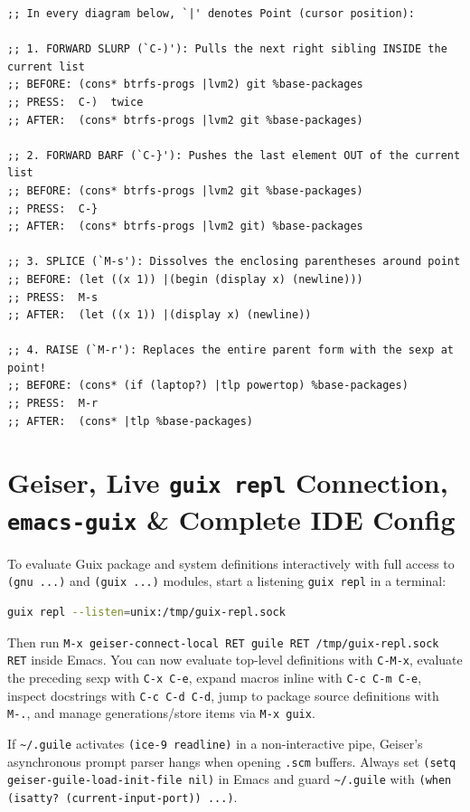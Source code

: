\documentclass[11pt,oneside]{book}
\begin{document}
\begin{lstlisting}[language=GuileScheme]
;; In every diagram below, `|' denotes Point (cursor position):

;; 1. FORWARD SLURP (`C-)'): Pulls the next right sibling INSIDE the current list
;; BEFORE: (cons* btrfs-progs |lvm2) git %base-packages
;; PRESS:  C-)  twice
;; AFTER:  (cons* btrfs-progs |lvm2 git %base-packages)

;; 2. FORWARD BARF (`C-}'): Pushes the last element OUT of the current list
;; BEFORE: (cons* btrfs-progs |lvm2 git %base-packages)
;; PRESS:  C-}
;; AFTER:  (cons* btrfs-progs |lvm2 git) %base-packages

;; 3. SPLICE (`M-s'): Dissolves the enclosing parentheses around point
;; BEFORE: (let ((x 1)) |(begin (display x) (newline)))
;; PRESS:  M-s
;; AFTER:  (let ((x 1)) |(display x) (newline))

;; 4. RAISE (`M-r'): Replaces the entire parent form with the sexp at point!
;; BEFORE: (cons* (if (laptop?) |tlp powertop) %base-packages)
;; PRESS:  M-r
;; AFTER:  (cons* |tlp %base-packages)
\end{lstlisting}

\section{Geiser, Live \texttt{guix repl} Connection, \texttt{emacs-guix} \& Complete IDE Config}

To evaluate Guix package and system definitions interactively with full access to \texttt{(gnu ...)} and \texttt{(guix ...)} modules, start a listening \texttt{guix repl} in a terminal:
\begin{lstlisting}[language=Bash]
guix repl --listen=unix:/tmp/guix-repl.sock
\end{lstlisting}
Then run \texttt{M-x geiser-connect-local RET guile RET /tmp/guix-repl.sock RET} inside Emacs. You can now evaluate top-level definitions with \texttt{C-M-x}, evaluate the preceding sexp with \texttt{C-x C-e}, expand macros inline with \texttt{C-c C-m C-e}, inspect docstrings with \texttt{C-c C-d C-d}, jump to package source definitions with \texttt{M-.}, and manage generations/store items via \texttt{M-x guix}.

\begin{protrap}
If \texttt{\textasciitilde/.guile} activates \texttt{(ice-9 readline)} in a non-interactive pipe, Geiser's asynchronous prompt parser hangs when opening \texttt{.scm} buffers. Always set \texttt{(setq geiser-guile-load-init-file nil)} in Emacs and guard \texttt{\textasciitilde/.guile} with \texttt{(when (isatty? (current-input-port)) ...)}.
\end{protrap}
\end{document}

